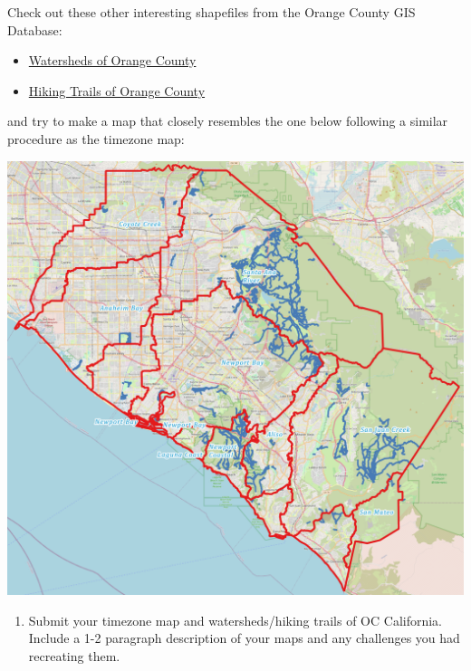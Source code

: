 \documentclass[oneside,a4paper,11pt,explicit]{book}
\begin{document}
\begin{tcolorbox}[colback=yellow!5!white,colframe=IceCreamOrbit,title= \vspace{.2em} \Large Map of the Week Assignments]
	
	Check out these other interesting shapefiles from the Orange County GIS Database:

	\begin{itemize}
		\item \href{https://jeremydforsythe.github.io/icecream-tutorials/Tutorial2_MakingBasicMapsInQGIS/Regional_Subbasins_and_Watersheds.zip}{Watersheds of Orange County}
		\item \href{https://jeremydforsythe.github.io/icecream-tutorials/Tutorial2_MakingBasicMapsInQGIS/OC_Parks_Trails.zip}{Hiking Trails of Orange County}
	\end{itemize}

	and try to make a map that closely resembles the one below following a similar procedure as the timezone map: 

	\centerline{\includegraphics[width=.75\textwidth]{OCWatershedAndTrails.png}}

	\large
	\begin{enumerate}
		\item Submit your timezone map and watersheds/hiking trails of OC California. Include a 1-2 paragraph description of your maps and any challenges you had recreating them.
    \end{enumerate}
\end{tcolorbox}

\end{document}
